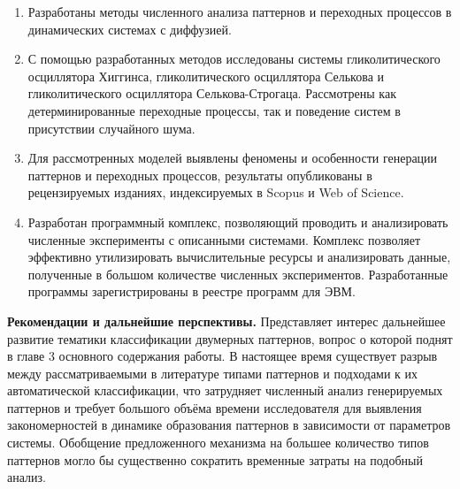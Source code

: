 \begin{enumerate}
  \item Разработаны методы численного анализа паттернов и переходных процессов в динамических системах с диффузией. 
  \item С помощью разработанных методов исследованы системы гликолитического осциллятора Хиггинса, гликолитического осциллятора Селькова и гликолитического осциллятора Селькова-Строгаца. Рассмотрены как детерминированные переходные процессы, так и поведение систем в присутствии случайного шума.
  \item Для рассмотренных моделей выявлены феномены и особенности генерации паттернов и переходных процессов, результаты опубликованы в рецензируемых изданиях, индексируемых в Scopus и Web of Science.
  \item Разработан программный комплекс, позволяющий проводить и анализировать численные эксперименты с описанными системами. Комплекс позволяет эффективно утилизировать вычислительные ресурсы и анализировать данные, полученные в большом количестве численных экспериментов. Разработанные программы зарегистрированы в реестре программ для ЭВМ.
\end{enumerate}

\textbf{Рекомендации и дальнейшие перспективы.}
Представляет интерес дальнейшее развитие тематики классификации двумерных паттернов, вопрос о которой поднят в главе 3 основного содержания работы. В настоящее время существует разрыв между рассматриваемыми в литературе типами паттернов и подходами к их автоматической классификации, что затрудняет численный анализ генерируемых паттернов и требует большого объёма времени исследователя для выявления закономерностей в динамике образования паттернов в зависимости от параметров системы. Обобщение предложенного механизма на большее количество типов паттернов могло бы существенно сократить временные затраты на подобный анализ.
